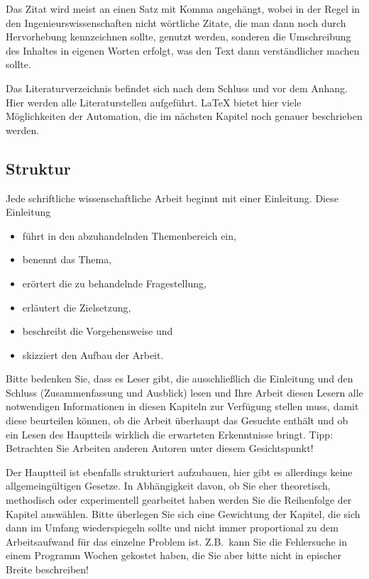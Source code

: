 Das Zitat wird meist an einen Satz mit Komma angehängt, wobei in
der Regel in den Ingenieurswissenschaften nicht wörtliche Zitate,
die man dann noch durch Hervorhebung kennzeichnen sollte, genutzt
werden, sonderen die Umschreibung des Inhaltes in eigenen Worten
erfolgt, was den Text dann verständlicher machen sollte.

Das Literaturverzeichnis befindet sich nach dem Schluss und vor
dem Anhang. Hier werden alle Literaturstellen aufgeführt. \LaTeX
bietet hier viele Möglichkeiten der Automation, die im nächsten
Kapitel noch genauer beschrieben werden.

\subsection{Struktur}


Jede schriftliche wissenschaftliche Arbeit beginnt mit einer
Einleitung. Diese Einleitung
\begin{itemize}
    \item führt in den abzuhandelnden Themenbereich ein,
    \item benennt das Thema,
    \item erörtert die zu behandelnde Fragestellung,
    \item erläutert die Zielsetzung,
    \item beschreibt die Vorgehensweise und
    \item skizziert den Aufbau der Arbeit.
\end{itemize}

Bitte bedenken Sie, dass es Leser gibt, die ausschließlich die
Einleitung und den Schluss (Zusammenfassung und Ausblick) lesen
und Ihre Arbeit diesen Lesern alle notwendigen Informationen in
diesen Kapiteln zur Verfügung stellen muss, damit diese beurteilen
können, ob die Arbeit überhaupt das Gesuchte enthält und ob ein
Lesen des Hauptteils wirklich die erwarteten Erkenntnisse bringt.
Tipp: Betrachten Sie Arbeiten anderen Autoren unter diesem
Gesichtspunkt!

Der Hauptteil ist ebenfalls strukturiert aufzubauen, hier gibt es
allerdings keine allgemeingültigen Gesetze. In Abhängigkeit davon,
ob Sie eher theoretisch, methodisch oder experimentell gearbeitet
haben werden Sie die Reihenfolge der Kapitel auswählen. Bitte
überlegen Sie sich eine Gewichtung der Kapitel, die sich dann im
Umfang wiederspiegeln sollte und nicht immer proportional zu dem
Arbeitsaufwand für das einzelne Problem ist. Z.B.\ kann Sie die
Fehlersuche in einem Programm Wochen gekostet haben, die Sie aber
bitte nicht in epischer Breite beschreiben!


